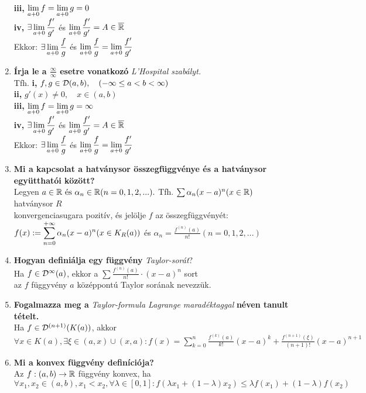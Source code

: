 \documentclass[a4paper,11pt]{article}
\begin{document}
\begin{enumerate}
	\\[0.2cm]\hspace*{0.8cm}\textbf{iii,} $\displaystyle\lim_{a+0} f=\displaystyle\lim_{a+0} g=0$
	\\[0.2cm]\hspace*{0.8cm}\textbf{iv,} $\exists\displaystyle\lim_{a+0} \frac{f'}{g'}$ és $\displaystyle\lim_{a+0}\frac{f'}{g'}=A\in\overline{\mathbb{R}}$\\[0.2cm] Ekkor: $\exists\displaystyle\lim_{a+0}
	\frac{f}{g}$ és $\displaystyle\lim_{a+0}\frac{f}{g}=\displaystyle\lim_{a+0}\frac{f'}{g'}$
	\item \textbf{Írja le a $\frac{\infty}{\infty}$ esetre vonatkozó}
	\textit{L'Hospital szabályt.}\\[0.1cm]
	Tfh. \textbf{i,} $f,g\in\mathcal{D}(a,b),\quad(-\infty\leq a<b<\infty)$\\[0.2cm] 
	\hspace*{0.8cm}\textbf{ii,} $g'(x)\neq0,\quad x\in(a,b)$\\[0.2cm] 
	\hspace*{0.8cm}\textbf{iii,} $\displaystyle\lim_{a+0} f=\displaystyle\lim_{a+0} g=\infty$\\[0.2cm]
	\hspace*{0.8cm}\textbf{iv,} $\exists\displaystyle\lim_{a+0}\frac{f'}{g'}$ és $\displaystyle\lim_{a+0}
	\frac{f'}{g'}=A\in\overline{\mathbb{R}}$\\[0.2cm] Ekkor: $\exists\displaystyle\lim_{a+0}\frac{f}{g}$ és $\displaystyle\lim_{a+0}\frac{f}{g}=\displaystyle\lim_{a+0}\frac{f'}{g'}$
	\item \textbf{Mi a kapcsolat a hatványsor összegfüggvénye és a hatványsor együtthatói között?}\\[0.1cm]
	Legyen $a\in\mathbb{R}\text{ és }\alpha_n\in\mathbb{R}(n=0,1,2,...).$ Tfh. $\sum\alpha_n
	(x-a)^n(x\in\mathbb{R})$ hatványsor $R$\\konvergenciasugara pozitív, és jelölje
	$f$ az összegfüggvényét:\\$f(x):=\displaystyle\sum_{n=0}^{+\infty}\alpha_n(x-a)^n(x\in K_R(a))$ és
	$\alpha_n=\frac{f^{(n)}(a)}{n!}(n=0,1,2,...)$
	\item\textbf{Hogyan definiálja egy függvény} \textit{Taylor-sorát}?\\[0.1cm]
	Ha $f\in\mathcal{D}^{\infty}(a)$, ekkor a $\sum\frac{f^{(n)}(a)}{n!} 
	\cdot(x-a)^{n}$ sort\\az $f$ függyvény $a$ középpontú Taylor sorának nevezzük.
	\item\textbf{Fogalmazza meg a} \textit{Taylor-formula Lagrange maradéktaggal}
	\textbf{néven tanult tételt.}\\[0.1cm]
	Ha $f\in\mathcal{D}^{(n+1)}(K(a))$, akkor\\[0.1cm]$\forall x\in K(a),\exists\xi\in(a,x)
	\cup(x,a):f(x)=\sum\limits_{k=0}^{n}\frac{f^{(k)}(a)}{k!}(x-a)^k+
	\frac{f^{(n+1)}(\xi)}{(n+1)!}(x-a)^{n+1}$
	\item \textbf{Mi a konvex függvény definíciója?}\\[0.1cm]Az $f:(a,b)\to\mathbb{R}$ függvény konvex, ha\\[0.1cm] $\forall x_1,x_2\in(a,b),x_1<x_2,\forall\lambda\in[0,1]: f(\lambda x_1+(1-\lambda)x_2)\leq\lambda f(x_1)+(1-\lambda)f(x_2)$\newpage

\end{enumerate}
\end{document}
